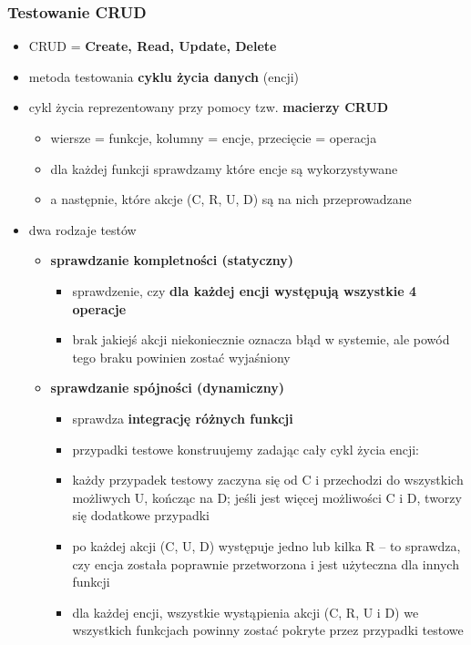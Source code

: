 \documentclass[../main.tex]{subfiles}
\begin{document}
    \subsubsection{Testowanie CRUD}

    \begin{itemize}
        \item CRUD = \textbf{Create, Read, Update, Delete}
        \item metoda testowania \textbf{cyklu życia danych} (encji)
        \item cykl życia reprezentowany przy pomocy tzw. \textbf{macierzy CRUD}
        \begin{itemize}
            \item wiersze = funkcje, kolumny = encje, przecięcie = operacja
            \item dla każdej funkcji sprawdzamy które encje są wykorzystywane
            \item a następnie, które akcje (C, R, U, D) są na nich przeprowadzane
        \end{itemize}
        \item dwa rodzaje testów
        \begin{itemize}
            \item \textbf{sprawdzanie kompletności (statyczny)}
            \begin{itemize}
                \item sprawdzenie, czy \textbf{dla każdej encji występują wszystkie 4 operacje}
                \item brak jakiejś akcji niekoniecznie oznacza błąd w systemie, ale powód tego braku powinien zostać wyjaśniony
            \end{itemize}
            \item \textbf{sprawdzanie spójności (dynamiczny)}
            \begin{itemize}
                \item sprawdza \textbf{integrację różnych funkcji}
                \item przypadki testowe konstruujemy zadając cały cykl życia encji:
                \item każdy przypadek testowy zaczyna się od C i przechodzi do
                wszystkich możliwych U, kończąc na D; jeśli jest więcej możliwości
                C i D, tworzy się dodatkowe przypadki
                \item po każdej akcji (C, U, D) występuje jedno lub kilka R – to sprawdza,
                czy encja została poprawnie przetworzona i jest użyteczna dla innych funkcji
                \item dla każdej encji, wszystkie wystąpienia akcji (C, R, U i D) we
                wszystkich funkcjach powinny zostać pokryte przez przypadki testowe
            \end{itemize}
        \end{itemize}
    \end{itemize}
\end{document}
